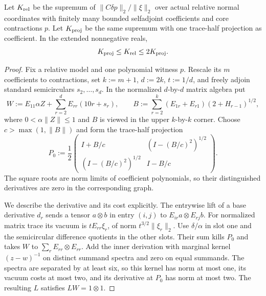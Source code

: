 \begin{lemma}\label{lem:projection-transfer}
Let $K_{\rm rel}$ be the supremum of $\|C\delta p\|_2/\|\xi\|_2$ over actual relative normal coordinates with finitely many bounded selfadjoint coefficients and core contractions $p$.
Let $K_{\rm proj}$ be the same supremum with one trace-half projection as coefficient.
In the extended nonnegative reals,
\[
 K_{\rm proj}\le K_{\rm rel}\le2K_{\rm proj}.
\]
\end{lemma}
\begin{proof}
Fix a relative model and one polynomial witness $p$.
Rescale its $m$ coefficients to contractions, set $k:=m+1$, $d:=2k$, $t:=1/d$, and freely adjoin standard semicirculars $s_2,\ldots,s_d$.
In the normalized $d$-by-$d$ matrix algebra put
\[
 W:=E_{11}\alpha Z+\sum_{r=2}^dE_{rr}(10r+s_r),\qquad
 B:=\sum_{r=2}^k(E_{1r}+E_{r1})(2+H_{r-1})^{1/2},
\]
where $0<\alpha\|Z\|\le1$ and $B$ is viewed in the upper $k$-by-$k$ corner.
Choose $c>\max(1,\|B\|)$ and form the trace-half projection
\[
 P_0:=\frac12
 \begin{pmatrix}I+B/c&(I-(B/c)^2)^{1/2}\\(I-(B/c)^2)^{1/2}&I-B/c\end{pmatrix}.
\]
The square roots are norm limits of coefficient polynomials, so their distinguished derivatives are zero in the corresponding graph.

We describe the derivative and its cost explicitly.
The entrywise lift of a base derivative $d_r$ sends a tensor $a\otimes b$ in entry $(i,j)$ to $E_{ir}a\otimes E_{rj}b$.
For normalized matrix trace its vacuum is $tE_{rr}\xi_r$, of norm $t^{3/2}\|\xi_r\|_2$.
Use $\delta/\alpha$ in slot one and the semicircular difference quotients in the other slots.
Their sum kills $P_0$ and takes $W$ to $\sum_rE_{rr}\otimes E_{rr}$.
Add the inner derivation with marginal kernel $(z-w)^{-1}$ on distinct summand spectra and zero on equal summands.
The spectra are separated by at least six, so this kernel has norm at most one, its vacuum costs at most two, and its derivative at $P_0$ has norm at most two.
The resulting $L$ satisfies $LW=1\otimes1$.


\end{proof}

